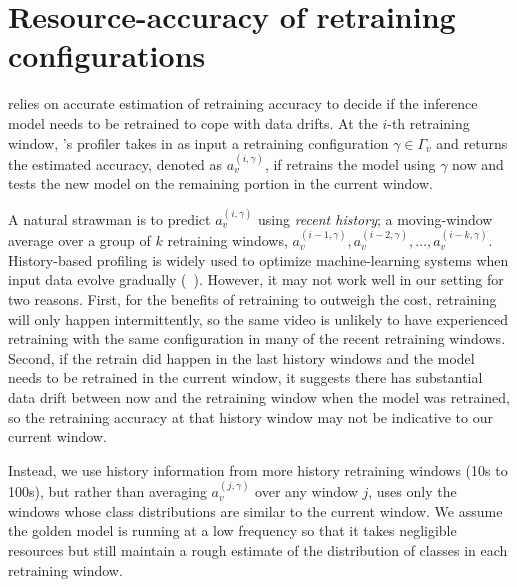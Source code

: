 \section{Resource-accuracy of retraining configurations}
\label{sec:profiling}


\name relies on accurate estimation of retraining accuracy to decide if the inference model needs to be retrained to cope with data drifts.
At the $i$-th retraining window, \name's profiler takes in as input a retraining configuration $\gamma\in \Gamma_v$ and returns the estimated accuracy, denoted as $a_v^{(i,\gamma)}$, if \name retrains the model using $\gamma$ now and tests the new model on the remaining portion in the current window.


A natural strawman is to predict $a_v^{(i,\gamma)}$ using {\em recent history}; \eg a moving-window average over a group of $k$ retraining windows, $a_v^{(i-1,\gamma)},a_v^{(i-2,\gamma)},\dots,a_v^{(i-k,\gamma)}$.
History-based profiling is widely used to optimize machine-learning systems when input data evolve gradually (\eg~\cite{awstream,chameleon}).
However, it may not work well in our setting for two reasons.
First, for the benefits of retraining to outweigh the cost, retraining will only happen intermittently, so the same video is unlikely to have experienced retraining with the same configuration in many of the recent retraining windows.
Second, if the retrain did happen in the last history windows and the model needs to be retrained in the current window, it suggests there has substantial data drift between now and the retraining window when the model was retrained, so the retraining accuracy at that history window may not be indicative to our current window.


Instead, we use history information from more history retraining windows (10s to 100s), but 
rather than averaging $a_v^{(j,\gamma)}$ over any window $j$, \name uses only the windows whose class distributions are similar to the current window. 
We assume the golden model is running at a low frequency so that it takes negligible resources but still maintain a rough estimate of the distribution of classes in each retraining window.


